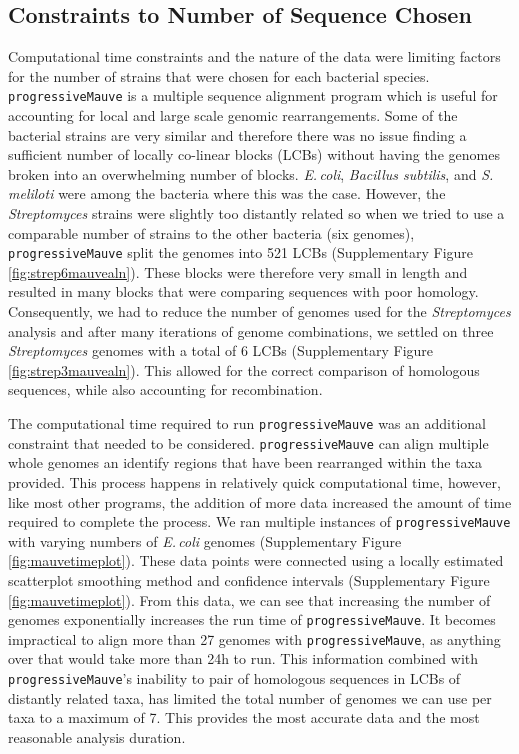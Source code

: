\documentclass[11pt]{article}
\newcommand{\smel}{\textit{S.\,meliloti}\xspace}
\newcommand{\strep}{\textit{Streptomyces}\xspace}
\newcommand{\ecol}{\textit{E.\,coli}\xspace}
\newcommand{\bas}{\textit{Bacillus subtilis}\xspace}
\newcommand{\p}{\texttt{progressiveMauve}\xspace}
\begin{document}
\subsection{Constraints to Number of Sequence Chosen}
Computational time constraints and the nature of the data were limiting factors for the number of strains that were chosen for each bacterial species.
\p is a multiple sequence alignment program which is useful for accounting for local and large scale genomic rearrangements. 
Some of the bacterial strains are very similar and therefore there was no issue finding a sufficient number of locally co-linear blocks (LCBs) without having the genomes broken into an overwhelming number of blocks.
\ecol, \bas, and \smel were among the bacteria where this was the case.
However, the \strep strains were slightly too distantly related so when we tried to use a comparable number of strains to the other bacteria (six genomes), \p split the genomes into 521 LCBs (Supplementary Figure \ref{fig:strep6mauvealn}).
These blocks were therefore very small in length and resulted in many blocks that were comparing sequences with poor homology.
Consequently, we had to reduce the number of genomes used for the \strep analysis and after many iterations of genome combinations, we settled on three \strep genomes with a total of 6 LCBs (Supplementary Figure \ref{fig:strep3mauvealn}).
This allowed for the correct comparison of homologous sequences, while also accounting for recombination.


The computational time required to run \p was an additional constraint that needed to be considered.
\p can align multiple whole genomes an identify regions that have been rearranged within the taxa provided.
This process happens in relatively quick computational time, however, like most other programs, the addition of more data increased the amount of time required to complete the process.
We ran multiple instances of \p with varying numbers of \ecol genomes (Supplementary Figure \ref{fig:mauvetimeplot}).
These data points were connected using a locally estimated scatterplot smoothing method and confidence intervals (Supplementary Figure \ref{fig:mauvetimeplot}).
From this data, we can see that increasing the number of genomes exponentially increases the run time of \p.
It becomes impractical to align more than 27 genomes with \p, as anything over that would take more than 24h to run.
This information combined with \p's inability to pair of homologous sequences in LCBs of distantly related taxa, has limited the total number of genomes we can use per taxa to a maximum of 7.
This provides the most accurate data and the most reasonable analysis duration.
\end{document}
